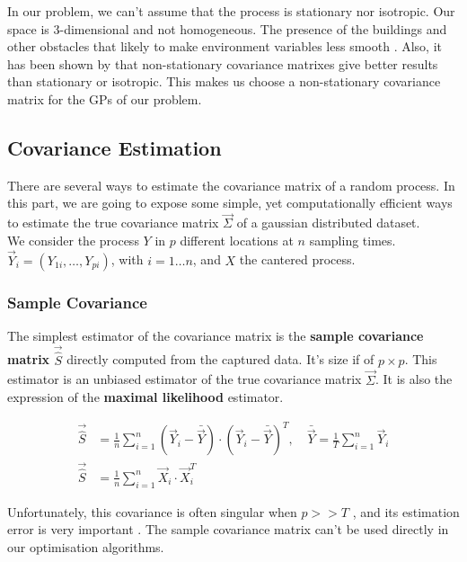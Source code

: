 In our problem, we can't assume that the process is stationary nor isotropic. Our space is 3-dimensional and not homogeneous. The presence of the buildings and other obstacles that likely to make environment variables less smooth \citep{paciorek_nonstationary_2004}. Also, it has been shown by \citet{krause_near-optimal_2008} that non-stationary covariance matrixes give better results than stationary or isotropic. This makes us choose a non-stationary covariance matrix for the  GPs of our problem.


\subsection{Covariance Estimation}


There are several ways to estimate the covariance matrix of a random process. In this part, we are going to expose some simple, yet computationally efficient ways to estimate the true covariance matrix $\vec{\Sigma}$ of a gaussian distributed dataset.\\

We consider the process $Y$ in $p$ different locations at $n$ sampling times. $\vec{Y}_i = (Y_{1i}, \dots, Y_{pi})$, with $i = 1 \dots n$, and $X$ the cantered process. \\

\subsubsection{Sample Covariance}

The simplest estimator of the covariance matrix is the \textbf{sample covariance matrix} $ \vec{\hat{S}} $ directly computed from the captured data. It's size if of $p\times p$. This estimator is an unbiased estimator of the true covariance matrix $\vec{\Sigma}$. It is also the expression of the \textbf{maximal likelihood} estimator. 

\begin{align}
    \vec{\hat{S}} &= \frac{1}{n} \sum_{i=1}^n (\vec{Y}_i - \bar{\vec{Y}})\cdot (\vec{Y}_i - \bar{\vec{Y}})^T, \quad \bar{\vec{Y}} = \frac{1}{T} \sum_{i=1}^n \vec{Y}_i \\
    \vec{\hat{S}} &= \frac{1}{n} \sum_{i=1}^n \vec{X}_i \cdot \vec{X}_i^T 
\end{align}

Unfortunately, this covariance is often singular when $p >> T$ \citep{fan_overview_2015}, and its estimation error is very important \citep{ledoit_honey_2003}. The sample covariance matrix can't be used directly in our optimisation algorithms. 

